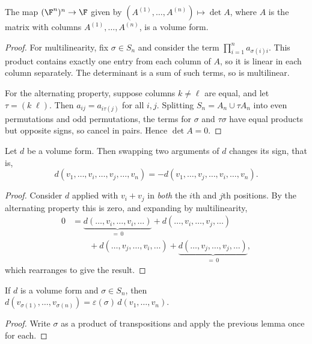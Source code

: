 \begin{lemma}
    The map $(\F^n)^n \rightarrow \F$ given by $(A^{(1)}, \dots, A^{(n)}) \mapsto \det A$, where $A$ is the matrix with columns $A^{(1)}, \dots, A^{(n)}$, is a volume form.
\end{lemma}
\begin{proof}
    For multilinearity, fix $\sigma \in S_n$ and consider the term $\prod_{i = 1}^n a_{\sigma(i)i}$. This product contains exactly one entry from each column of $A$, so it is linear in each column separately. The determinant is a sum of such terms, so is multilinear.

    For the alternating property, suppose columns $k \neq \ell$ are equal, and let $\tau = (k\;\ell)$. Then $a_{i j} = a_{i \tau(j)}$ for all $i, j$. Splitting $S_n = A_n \cup \tau A_n$ into even permutations and odd permutations, the terms for $\sigma$ and $\tau\sigma$ have equal products but opposite signs, so cancel in pairs. Hence $\det A = 0$.
\end{proof}

\begin{lemma}
    Let $d$ be a volume form. Then swapping two arguments of $d$ changes its sign, that is,
    $$
    d(v_1, \dots, v_i, \dots, v_j, \dots, v_n) = -d(v_1, \dots, v_j, \dots, v_i, \dots, v_n).
    $$
\end{lemma}
\begin{proof}
    Consider $d$ applied with $v_i + v_j$ in \emph{both} the $i$th and $j$th positions. By the alternating property this is zero, and expanding by multilinearity,
    \begin{align*}
    0 &= \underbrace{d(\dots, v_i, \dots, v_i, \dots)}_{= \, 0} + d(\dots, v_i, \dots, v_j, \dots) \\
    &\qquad + d(\dots, v_j, \dots, v_i, \dots) + \underbrace{d(\dots, v_j, \dots, v_j, \dots)}_{=\, 0},
    \end{align*}
    which rearranges to give the result.
\end{proof}

\begin{corollary}
    If $d$ is a volume form and $\sigma \in S_n$, then $d(v_{\sigma(1)}, \dots, v_{\sigma(n)}) = \varepsilon(\sigma)\, d(v_1, \dots, v_n)$.
\end{corollary}
\begin{proof}
    Write $\sigma$ as a product of transpositions and apply the previous lemma once for each.
\end{proof}

